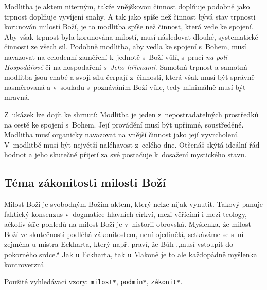 Modlitba je aktem niterným, takže vnějškovou činnost doplňuje podobně jako
trpnost doplňuje vyvíjení snahy. A tak jako spíše než činnost bývá stav trpnosti
korunován milostí Boží, je to modlitba spíše než činnost, která vede ke spojení.
Aby však trpnost byla korunována milostí, musí následovat dlouhé, systematické
činnosti ze všech sil. Podobně modlitba, aby vedla ke spojení s~Bohem, musí
navazovat na celodenní zaměření k~jednotě s~Boží vůlí, s~prací \textit{na poli
Hospodářově} či na hospodaření \textit{s~Jeho hřivnami}. Samotná trpnost a
samotná modlitba jsou chabé a svoji sílu čerpají z~činnosti, která však musí být
správně nasměrovaná a v~souladu s~poznáváním Boží vůle, tedy minimálně musí být
mravná.

Z~ukázek lze dojít ke shrnutí: Modlitba je jeden z~nepostradatelných prostředků
na cestě ke spojení s~Bohem. Její provádění musí být upřímné, soustředěné.
Modlitba musí organicky navazovat na vnější činnost jako její vyvrcholení.
V~modlitbě musí být největší naléhavost z~celého dne. Otčenáš skýtá ideální řád
hodnot a jeho skutečné přijetí za své postačuje k~dosažení mystického stavu.

\subsection{Téma zákonitosti milosti Boží}

Milost Boží je svobodným Božím aktem, který nelze nijak vynutit. Takový panuje
faktický konsenzus v~dogmatice hlavních církví, mezi věřícími i mezi teology,
ačkoliv šíře pohledů na milost Boží je v~historii
obrovská\cite{pinnock1989grace}\cite{studer1997grace}.\cite{grace1965luther}
Myšlenka, že milost Boží ve skutečnosti podléhá zákonitostem, není ojedinělá,
setkáváme se s~ní zejména u mistra Eckharta,\cite{landauer1978eckhart} který
např. praví, že Bůh ,,musí vstoupit do pokorného srdce.`` Jak u Eckharta, tak u
Makoně je to ale každopádně myšlenka kontroverzní.

Použité vyhledávací vzory:
\texttt{milost*},
\texttt{podmín*},
\texttt{zákonit*}.

